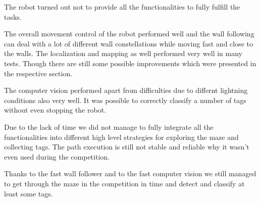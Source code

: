 The robot turned out not to provide all the functionalities to fully fulfill the tasks.

The overall movement control of the robot performed well and the wall following can deal with a lot of different wall constellations while moving fast and close to the walls.
The localization and mapping as well performed very well in many tests. Though there are still some possible improvements which were presented in the respective section.

The computer vision performed apart from difficulties due to differnt lightning conditions also very well. It was possible to correctly classify a number of tags without even stopping the robot.

Due to the lack of time we did not manage to fully integrate all the functionalities into different high level strategies for exploring the maze and collecting tags. The path execution is still not stable and reliable why it wasn't even used during the competition. 

Thanks to the fast wall follower and to the fast computer vision we still managed to get through the maze in the competition in time and detect and classify at least some tags. 